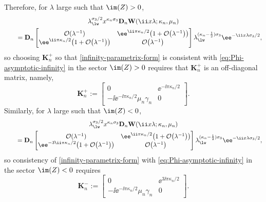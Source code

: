 Therefore, for $\lambda$ large such that $\im(Z)>0$,
\begin{gather*}
 \lambda_{\lw}^{\sigma_3/2}x^{\kappa_n\sigma_3}\mathbf{D}_n\mathbf{W}(\ii x\lambda;\kappa_n,\mu_n)\\
 \qquad=
 \mathbf{D}_n
 \begin{bmatrix}
 \mathcal{O}(\lambda^{-1}) & \ee^{\ii\pi\kappa_n/2}\big(1+\mathcal{O}\big(\lambda^{-1}\big)\big)\\
 \ee^{\ii\pi\kappa_n/2}\big(1+\mathcal{O}\big(\lambda^{-1}\big)\big) & \mathcal{O}\big(\lambda^{-1}\big)
 \end{bmatrix}\lambda_{\lw}^{(\kappa_n -\frac{1}{2})\sigma_3}\ee^{-\ii x\lambda\sigma_3/2},
\end{gather*}
so choosing $\mathbf{K}_n^+$ so that \eqref{infinity-parametrix-form} is consistent with \eqref{eq:Phi-asymptotic-infinity} in the sector $\im(Z)>0$ requires that $\mathbf{K}_n^+$ is an off-diagonal matrix, namely,
\begin{equation*}
 \mathbf{K}_n^+:=\begin{bmatrix}
 0 & \ee^{-\ii\pi\kappa_n/2}\\
 -\ii\ee^{-\ii\pi\kappa_n/2}\mu_n\gamma_n & 0
 \end{bmatrix}.
\end{equation*}
Similarly, for $\lambda$ large such that $\im(Z)<0$,
\begin{gather*}
 \lambda_{\lw}^{\sigma_3/2}x^{\kappa_n\sigma_3}\mathbf{D}_n\mathbf{W}(\ii x\lambda;\kappa_n,\mu_n) \\
 \qquad= \mathbf{D}_n\begin{bmatrix}
 \mathcal{O}(\lambda^{-1}) & \ee^{\ii\pi\kappa_n/2}\big(1+\mathcal{O}\big(\lambda^{-1}\big)\big)\\
 \ee^{-3\ii\pi\kappa_n/2}\big(1+\mathcal{O}\big(\lambda^{-1}\big)\big) & \mathcal{O}\big(\lambda^{-1}\big)
 \end{bmatrix}\lambda_{\lw}^{(\kappa_n-\frac{1}{2})\sigma_3}\ee^{-\ii x\lambda\sigma_3/2},
\end{gather*}
so consistency of \eqref{infinity-parametrix-form} with \eqref{eq:Phi-asymptotic-infinity} in the sector $\im(Z)<0$ requires
\begin{equation*}
 \mathbf{K}_n^-:=\begin{bmatrix}
 0 & \ee^{3\ii\pi\kappa_n/2}\\
 -\ii\ee^{-\ii\pi\kappa_n/2}\mu_n\gamma_n & 0
 \end{bmatrix}.
\end{equation*}

